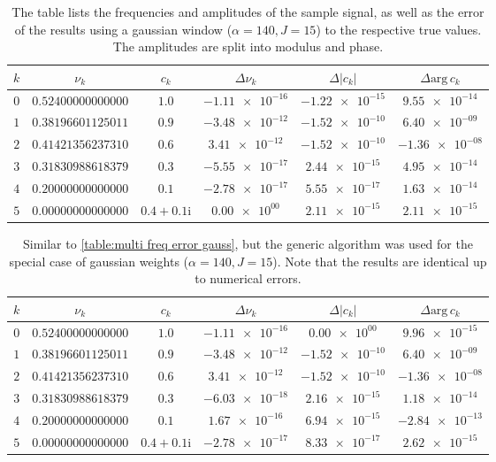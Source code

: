 \documentclass[english, parskip=full]{scrartcl}     %
\renewcommand{\i}{\text{i}}
\begin{document}
\begin{table}[!ht]
\centering
\begin{tabular}{cccccc}
\toprule
$k$ & $\nu_k$ & $c_k$ & $\Delta\nu_k$ & $\Delta |c_k|$ & $\Delta \text{arg}\,c_k$ \\ \midrule 
$0$ & $0.52400000000000$ & $1.0$ & $\num{-1.11e-16}$ & $\num{-1.22e-15}$ & $\num{9.55e-14}$\\
$1$ & $0.38196601125011$ & $0.9$ & $\num{-3.48e-12}$ & $\num{-1.52e-10}$ & $\num{6.40e-09}$\\
$2$ & $0.41421356237310$ & $0.6$ & $\num{3.41e-12}$ & $\num{-1.52e-10}$ & $\num{-1.36e-08}$\\
$3$ & $0.31830988618379$ & $0.3$ & $\num{-5.55e-17}$ & $\num{2.44e-15}$ & $\num{4.95e-14}$\\
$4$ & $0.20000000000000$ & $0.1$ & $\num{-2.78e-17}$ & $\num{5.55e-17}$ & $\num{1.63e-14}$\\
$5$ & $0.00000000000000$ & $0.4+0.1\i$ & $\num{0.00e+00}$ & $\num{2.11e-15}$ & $\num{2.11e-15}$\\
\bottomrule
\end{tabular}
\caption{The table lists the frequencies and amplitudes of the sample signal, as well as the error of the results using a gaussian window ($\alpha = 140, J=15$) to the respective true values.
The amplitudes are split into modulus and phase.}
\label{table:multi freq error gauss}
\end{table}
\begin{table}[!ht]
\centering
\begin{tabular}{cccccc}
\toprule
$k$ & $\nu_k$ & $c_k$ & $\Delta\nu_k$ & $\Delta |c_k|$ & $\Delta \text{arg}\,c_k$ \\ \midrule 
$0$ & $0.52400000000000$ & $1.0$ & $\num{-1.11e-16}$ & $\num{0.00e+00}$ & $\num{9.96e-15}$\\
$1$ & $0.38196601125011$ & $0.9$ & $\num{-3.48e-12}$ & $\num{-1.52e-10}$ & $\num{6.40e-09}$\\
$2$ & $0.41421356237310$ & $0.6$ & $\num{3.41e-12}$ & $\num{-1.52e-10}$ & $\num{-1.36e-08}$\\
$3$ & $0.31830988618379$ & $0.3$ & $\num{-6.03e-18}$ & $\num{2.16e-15}$ & $\num{1.18e-14}$\\
$4$ & $0.20000000000000$ & $0.1$ & $\num{1.67e-16}$ & $\num{6.94e-15}$ & $\num{-2.84e-13}$\\
$5$ & $0.00000000000000$ & $0.4+0.1\i$ & $\num{-2.78e-17}$ & $\num{8.33e-17}$ & $\num{2.62e-15}$\\
\bottomrule
\end{tabular}
\caption{Similar to \autoref{table:multi freq error gauss}, but the generic algorithm was used for the special case of gaussian weights ($\alpha = 140, J=15$).
Note that the results are identical up to numerical errors.}
\label{table:multi freq error gauss generic}
\end{table}
\end{document}
